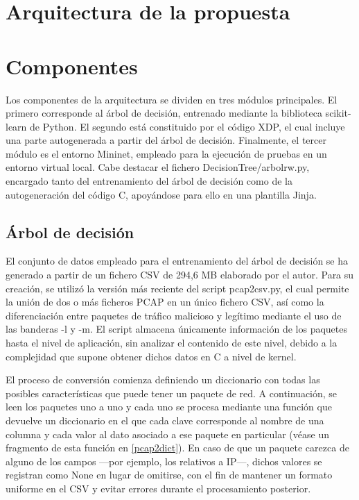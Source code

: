 \section{Arquitectura de la propuesta}

\section{Componentes}

Los componentes de la arquitectura se dividen en tres módulos principales. El primero corresponde al árbol de decisión, entrenado mediante la biblioteca scikit-learn de Python. El segundo está constituido por el código XDP, el cual incluye una parte autogenerada a partir del árbol de decisión. Finalmente, el tercer módulo es el entorno Mininet, empleado para la ejecución de pruebas en un entorno virtual local. Cabe destacar el fichero DecisionTree/arbolrw.py, encargado tanto del entrenamiento del árbol de decisión como de la autogeneración del código C, apoyándose para ello en una plantilla Jinja.

\subsection{Árbol de decisión}

El conjunto de datos empleado para el entrenamiento del árbol de decisión se ha generado a partir de un fichero CSV de 294,6 MB elaborado por el autor. Para su creación, se utilizó la versión más reciente del script pcap2csv.py, el cual permite la unión de dos o más ficheros PCAP en un único fichero CSV, así como la diferenciación entre paquetes de tráfico malicioso y legítimo mediante el uso de las banderas -l y -m. El script almacena únicamente información de los paquetes hasta el nivel de aplicación, sin analizar el contenido de este nivel, debido a la complejidad que supone obtener dichos datos en C a nivel de kernel.

El proceso de conversión comienza definiendo un diccionario con todas las posibles características que puede tener un paquete de red. A continuación, se leen los paquetes uno a uno y cada uno se procesa mediante una función que devuelve un diccionario en el que cada clave corresponde al nombre de una columna y cada valor al dato asociado a ese paquete en particular (véase un fragmento de esta función en \ref{pcap2dict}). En caso de que un paquete carezca de alguno de los campos —por ejemplo, los relativos a IP—, dichos valores se registran como None en lugar de omitirse, con el fin de mantener un formato uniforme en el CSV y evitar errores durante el procesamiento posterior.

